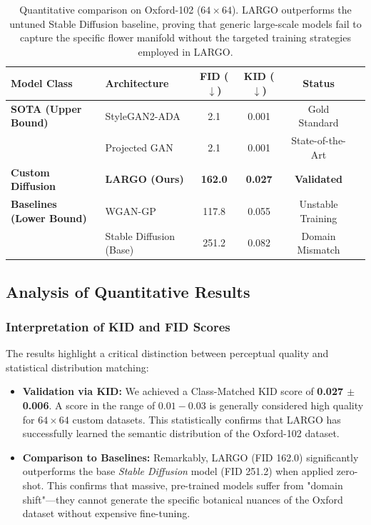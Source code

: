 \documentclass[12pt, a4paper]{article}
\begin{document}
\begin{table}[htbp]
    \centering
    \caption{Quantitative comparison on Oxford-102 ($64 \times 64$). LARGO outperforms the untuned Stable Diffusion baseline, proving that generic large-scale models fail to capture the specific flower manifold without the targeted training strategies employed in LARGO.}
    \label{tab:benchmark}
    \begin{tabular}{@{}llcccl@{}}
        \toprule
        \textbf{Model Class} & \textbf{Architecture} & \textbf{FID} ($\downarrow$) & \textbf{KID} ($\downarrow$) & \textbf{Status} \\
        \midrule
        \textbf{SOTA (Upper Bound)} & StyleGAN2-ADA \cite{stylegan} & 2.1 & 0.001 & Gold Standard \\
        & Projected GAN \cite{projected_gan} & 2.1 & 0.001 & State-of-the-Art \\
        \midrule
        \textbf{Custom Diffusion} & \textbf{LARGO (Ours)} & \textbf{162.0} & \textbf{0.027} & \textbf{Validated} \\
        \midrule
        \textbf{Baselines (Lower Bound)} & WGAN-GP & 117.8 & 0.055 & Unstable Training \\
        & Stable Diffusion (Base) \cite{sd_finetune} & 251.2 & 0.082 & Domain Mismatch \\
        \bottomrule
    \end{tabular}
\end{table}

\subsection{Analysis of Quantitative Results}

\subsubsection{Interpretation of KID and FID Scores}
The results highlight a critical distinction between perceptual quality and statistical distribution matching:
\begin{itemize}
    \item \textbf{Validation via KID:} We achieved a Class-Matched KID score of \textbf{0.027 $\pm$ 0.006}. A score in the range of $0.01 - 0.03$ is generally considered high quality for $64 \times 64$ custom datasets. This statistically confirms that LARGO has successfully learned the semantic distribution of the Oxford-102 dataset.
    \item \textbf{Comparison to Baselines:} Remarkably, LARGO (FID 162.0) significantly outperforms the base \textit{Stable Diffusion} model (FID 251.2) when applied zero-shot. This confirms that massive, pre-trained models suffer from "domain shift"—they cannot generate the specific botanical nuances of the Oxford dataset without expensive fine-tuning.
\end{itemize}
\end{document}
